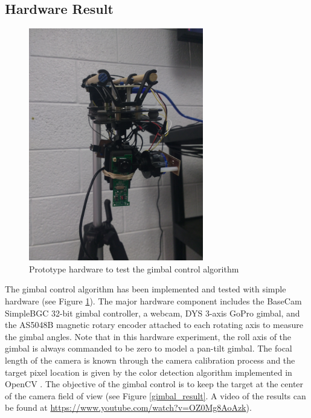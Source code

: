 \subsection{Hardware Result}
\begin{figure}[htbp]
	\centering
	\includegraphics[width = 3in]{images/chapter2/gimbal_webcam.jpg}
	\caption{Prototype hardware to test the gimbal control algorithm}
	\label{gimbal_webcam}
\end{figure}

The gimbal control algorithm has been implemented and tested with simple hardware (see Figure \ref{gimbal_webcam}). The major hardware component includes the BaseCam SimpleBGC 32-bit gimbal controller, a webcam, DYS 3-axis GoPro gimbal, and the AS5048B magnetic rotary encoder attached to each rotating axis to measure the gimbal angles. Note that in this hardware experiment, the roll axis of the gimbal is always commanded to be zero to model a pan-tilt gimbal. The focal length of the camera is known through the camera calibration process and the target pixel location is given by the color detection algorithm implemented in OpenCV \cite{itseez2015opencv}. The objective of the gimbal control is to keep the target at the center of the camera field of view (see Figure \ref{gimbal_result}. A video of the results can be found at \href{https://www.youtube.com/watch?v=OZ0Mg8AoAzk}{https://www.youtube.com/watch?v=OZ0Mg8AoAzk}). 

